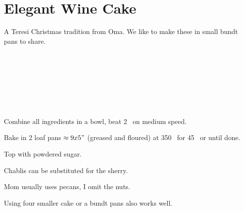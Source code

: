 \section{Elegant Wine Cake}


\begin{recipestats}[
	servings=2 loafs,
	source=Lucille Steinmiller (Oma),
	]
\end{recipestats}


\begin{recipeabstract}
	A Teresi Christmas tradition from Oma.
	We like to make these in small bundt pans to share.
\end{recipeabstract}


\begin{ingredientcolumns}[1]
	\begin{ingredientblock}
		\\
		\\
		\\
		\\
		\\
		\\
	\end{ingredientblock}
\end{ingredientcolumns}


\begin{preparation}
\item Combine all ingredients in a bowl, beat 2 \minute~on medium speed.

\item Bake in 2 loaf pans $\approx 9x5"$ (greased and floured) at 350 \Fahrenheit~for 45 \minute~or until done.

\item Top with powdered sugar.
\end{preparation}

\begin{variation}
\item Chablis can be substituted for the sherry.

\item Mom usually uses pecans, I  omit the nuts.

\item Using four smaller cake or a bundt pans also works well.

\end{variation}


\recipeend
